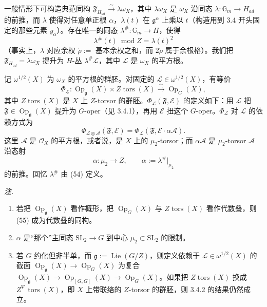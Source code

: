 一般情形下可构造典范同构 $\mathfrak{F}_{H_{ad}}\xrightarrow{\sim}\lambda\omega_{X}$，其中 $\lambda\omega_{X}$ 是 $\omega_{X}$ 沿同态 $\lambda:\mathbb{G}_{m}\to H_{ad}$ 的前推，而 $\lambda$ 使得对任意单正根 $\alpha$，$\lambda(t)$ 在 $\mathfrak{g}^{\alpha}$ 上乘以 $t$（构造用到 3.4 开头固定的那些元素 $y_{\alpha}$）。存在唯一的同态 $\lambda^{\#}:\mathbb{G}_{m}\to H$，使得
\begin{equation}\tag{54}
  \lambda^{\#}(t)\ \operatorname{mod}Z=\lambda(t)^{2}
\end{equation}
（事实上，$\lambda$ 对应余权 $\check{\rho}:=$ 基本余权之和，而 $2\check{\rho}$ 属于余根格）。我们把 $\mathfrak{F}_{H_{ad}}=\lambda\omega_{X}$ 提升为 $H$-丛 $\lambda^{\#}\mathcal{L}$，其中 $\mathcal{L}$ 是 $\omega_{X}$ 的平方根。

 记 $\omega^{1/2}(X)$ 为 $\omega_{X}$ 的平方根的群胚。对固定的 $\mathcal{L}\in\omega^{1/2}(X)$，有等价
\begin{equation}\tag{55}
  \Phi_{\mathcal{L}} : \operatorname{Op}_{\mathfrak{g}}(X)\times Z\operatorname{tors}(X)\xrightarrow{\ \sim\ }\operatorname{Op}_{G}(X),
\end{equation}
其中 $Z\operatorname{tors}(X)$ 是 $X$ 上 $Z$-torsor 的群胚。$\Phi_{\mathcal{L}}(\mathfrak{F},\mathcal{E})$ 的定义如下：用 $\mathcal{L}$ 把 $\mathfrak{F}\in\operatorname{Op}_{\mathfrak{g}}(X)$ 提升为 $G$-oper（见 3.4.1），再用 $\mathcal{E}$ 扭这个 $G$-oper。$\Phi_{\mathcal{L}}$ 对 $\mathcal{L}$ 的依赖方式为
\[
  \Phi_{\mathcal{L}\otimes\mathcal{A}}(\mathfrak{F},\mathcal{E})=\Phi_{\mathcal{L}}(\mathfrak{F},\mathcal{E}\cdot\alpha\mathcal{A}).
\]
这里 $\mathcal{A}$ 是 $\mathcal{O}_{X}$ 的平方根，或者说，是 $X$ 上的 $\mu_{2}$-torsor；而 $\alpha\mathcal{A}$ 是 $\mu_{2}$-torsor $\mathcal{A}$ 沿态射
\begin{equation}\tag{56}
  \alpha : \mu_{2}\longrightarrow Z,\qquad \alpha:=\lambda^{\#}|_{\mu_{2}}
\end{equation}
的前推。回忆 $\lambda^{\#}$ 由 (54) 定义。

\emph{注.}
\begin{enumerate}[label=(\roman*),leftmargin=2.2em]
  \item 若把 $\operatorname{Op}_{\mathfrak{g}}(X)$ 看作概形，把 $\operatorname{Op}_{G}(X)$ 与 $Z\operatorname{tors}(X)$ 看作代数叠，则 (55) 成为代数叠的同构。
  \item $\alpha$ 是“那个”主同态 $\mathrm{SL}_{2}\to G$ 到中心 $\mu_{2}\subset\mathrm{SL}_{2}$ 的限制。

  \item 若 $G$ 约化但非半单，而 $\mathfrak{g}:=\operatorname{Lie}(G/Z)$，则定义依赖于 $\mathcal{L}\in\omega^{1/2}(X)$ 的截面 $\operatorname{Op}_{\mathfrak{g}}(X)\to\operatorname{Op}_{G}(X)$ 为复合 $\operatorname{Op}_{\mathfrak{g}}(X)\to\operatorname{Op}_{[G,G]}(X)\to\operatorname{Op}_{G}(X)$。如果把 $Z\operatorname{tors}(X)$ 换成 $Z^{\nabla}\operatorname{tors}(X)$，即 $X$ 上带联络的 $Z$-torsor 的群胚，则 3.4.2 的结果仍然成立。
\end{enumerate}


